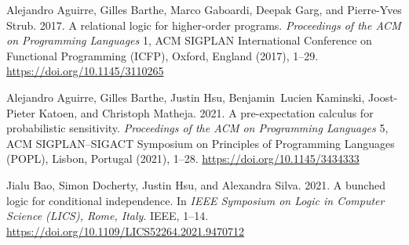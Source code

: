 \documentclass[acmsmall,nonacm,screen,appendix]{acmart}
\begin{document}
\newcommand{\SortNoop}[1]{}
\begin{thebibliography}{35}



\ifx \showCODEN    \undefined {}     \fi
\ifx \showDOI      \undefined \def \showDOI       #1{#1}\fi
\ifx \showISBNx    \undefined \def \showISBNx     #1{\unskip}     \fi
\ifx \showISBNxiii \undefined \def \showISBNxiii  #1{\unskip}     \fi
\ifx \showISSN     \undefined \def \showISSN      #1{\unskip}     \fi
\ifx \showLCCN     \undefined \def \showLCCN      #1{\unskip}     \fi
\ifx \shownote     \undefined \def \shownote      #1{#1}          \fi
\ifx \showarticletitle \undefined \def \showarticletitle #1{#1}   \fi
\ifx \showURL      \undefined \def \showURL       {\relax}        \fi
\providecommand\bibfield[2]{#2}
\providecommand\bibinfo[2]{#2}
\providecommand\natexlab[1]{#1}
\providecommand\showeprint[2][]{arXiv:#2}

\bibfield{author}{\bibinfo{person}{Alejandro Aguirre}, \bibinfo{person}{Gilles
  Barthe}, \bibinfo{person}{Marco Gaboardi}, \bibinfo{person}{Deepak Garg},
  {and} \bibinfo{person}{Pierre-Yves Strub}.} \bibinfo{year}{2017}\natexlab{}.
\newblock \showarticletitle{A relational logic for higher-order programs}.
\newblock \bibinfo{journal}{\emph{Proceedings of the {ACM} on Programming
  Languages}} \bibinfo{volume}{1}, \bibinfo{number}{{ACM} {SIGPLAN}
  {I}nternational {C}onference on {F}unctional {P}rogramming ({ICFP}), Oxford,
  England} (\bibinfo{year}{2017}), \bibinfo{pages}{1--29}.
\newblock
\urldef\tempurl \url{https://doi.org/10.1145/3110265}
\showDOI{\tempurl}


\bibfield{author}{\bibinfo{person}{Alejandro Aguirre}, \bibinfo{person}{Gilles
  Barthe}, \bibinfo{person}{Justin Hsu}, \bibinfo{person}{Benjamin~Lucien
  Kaminski}, \bibinfo{person}{Joost-Pieter Katoen}, {and}
  \bibinfo{person}{Christoph Matheja}.} \bibinfo{year}{2021}\natexlab{}.
\newblock \showarticletitle{A pre-expectation calculus for probabilistic
  sensitivity}.
\newblock \bibinfo{journal}{\emph{Proceedings of the {ACM} on Programming
  Languages}} \bibinfo{volume}{5}, \bibinfo{number}{{ACM} {SIGPLAN--SIGACT}
  {S}ymposium on {P}rinciples of {P}rogramming {L}anguages ({POPL}), Lisbon,
  Portugal} (\bibinfo{year}{2021}), \bibinfo{pages}{1--28}.
\newblock
\urldef\tempurl \url{https://doi.org/10.1145/3434333}
\showDOI{\tempurl}


\bibfield{author}{\bibinfo{person}{Jialu Bao}, \bibinfo{person}{Simon
  Docherty}, \bibinfo{person}{Justin Hsu}, {and} \bibinfo{person}{Alexandra
  Silva}.} \bibinfo{year}{2021}\natexlab{}.
\newblock \showarticletitle{A bunched logic for conditional independence}. In
  \bibinfo{booktitle}{\emph{{IEEE} {S}ymposium on {L}ogic in {C}omputer
  {S}cience ({LICS}), Rome, Italy}}. IEEE, \bibinfo{pages}{1--14}.
\newblock
\urldef\tempurl \url{https://doi.org/10.1109/LICS52264.2021.9470712}
\showDOI{\tempurl}



\end{thebibliography}
\end{document}
